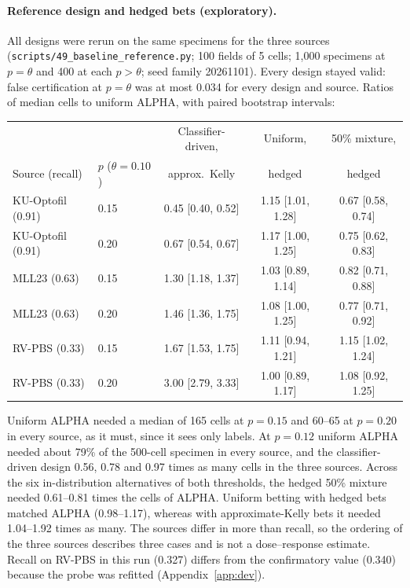 \documentclass[11pt]{article}
\theoremstyle{remark}
\theoremstyle{definition}
\begin{document}
\paragraph{Reference design and hedged bets (exploratory).} All designs were rerun on the same specimens for the three sources (\texttt{scripts/49\_baseline\_reference.py}; 100 fields of 5 cells; 1,000 specimens at $p=\theta$ and 400 at each $p>\theta$; seed family 20261101). Every design stayed valid: false certification at $p=\theta$ was at most 0.034 for every design and source. Ratios of median cells to uniform ALPHA, with paired bootstrap intervals:
\begin{center}\small
\begin{tabular}{@{}llccc@{}}
\toprule
 & & Classifier-driven, & Uniform, & 50\% mixture,\\
Source (recall) & $p$ ($\theta=0.10$) & approx.\ Kelly & hedged & hedged\\
\midrule
KU-Optofil (0.91) & 0.15 & 0.45 [0.40, 0.52] & 1.15 [1.01, 1.28] & 0.67 [0.58, 0.74]\\
KU-Optofil (0.91) & 0.20 & 0.67 [0.54, 0.67] & 1.17 [1.00, 1.25] & 0.75 [0.62, 0.83]\\
MLL23 (0.63) & 0.15 & 1.30 [1.18, 1.37] & 1.03 [0.89, 1.14] & 0.82 [0.71, 0.88]\\
MLL23 (0.63) & 0.20 & 1.46 [1.36, 1.75] & 1.08 [1.00, 1.25] & 0.77 [0.71, 0.92]\\
RV-PBS (0.33) & 0.15 & 1.67 [1.53, 1.75] & 1.11 [0.94, 1.21] & 1.15 [1.02, 1.24]\\
RV-PBS (0.33) & 0.20 & 3.00 [2.79, 3.33] & 1.00 [0.89, 1.17] & 1.08 [0.92, 1.25]\\
\bottomrule
\end{tabular}
\end{center}
Uniform ALPHA needed a median of 165 cells at $p=0.15$ and 60--65 at $p=0.20$ in every source, as it must, since it sees only labels. At $p=0.12$ uniform ALPHA needed about 79\% of the 500-cell specimen in every source, and the classifier-driven design 0.56, 0.78 and 0.97 times as many cells in the three sources. Across the six in-distribution alternatives of both thresholds, the hedged 50\% mixture needed 0.61--0.81 times the cells of ALPHA. Uniform betting with hedged bets matched ALPHA (0.98--1.17), whereas with approximate-Kelly bets it needed 1.04--1.92 times as many. The sources differ in more than recall, so the ordering of the three sources describes three cases and is not a dose--response estimate. Recall on RV-PBS in this run (0.327) differs from the confirmatory value (0.340) because the probe was refitted (Appendix~\ref{app:dev}).
\end{document}
